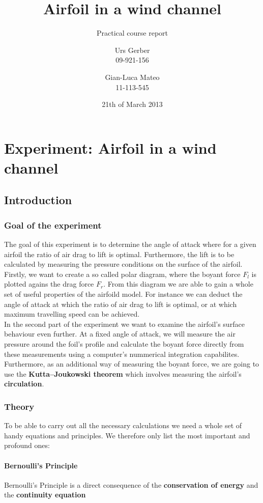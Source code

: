 \documentclass{scrreprt}
\author{Urs Gerber\\09-921-156 \and Gian-Luca Mateo\\11-113-545}
\date{21th of March 2013}
\title{Airfoil in a wind channel}
\subtitle{Practical course report}
\begin{document}
\maketitle

\tableofcontents
\newpage

\chapter{Experiment: Airfoil in a wind channel}
\section{Introduction}
\subsection{Goal of the experiment}
The goal of this experiment is to determine the angle of attack where for a given airfoil the ratio of air drag to lift is optimal. Furthermore, the lift is to be calculated by measuring the pressure conditions on the surface of the airfoil.\\

Firstly, we want to create a so called polar diagram, where the boyant force $F_l$ is plotted agains the drag force $F_r$. From this diagram we are able to gain a whole set of useful properties of the airfoild model. For instance we can deduct the angle of attack at which the ratio of air drag to lift is optimal, or at which maximum travelling speed can be achieved.\\

In the second part of the experiment we want to examine the airfoil's surface behaviour even further. At a fixed angle of attack, we will measure the air pressure around the foil's profile and calculate the boyant force directly from these measurements using a computer's nummerical integration capabilites. Furthermore, as an additional way of measuring the boyant force, we are going to use the \textbf{Kutta–Joukowski theorem} which involves measuring the airfoil's \textbf{circulation}.

\subsection{Theory}
To be able to carry out all the necessary calculations we need a whole set of handy equations and principles. We therefore only list the most important and profound ones:

\subsubsection{Bernoulli's Principle}
Bernoulli's Principle is a direct consequence of the \textbf{conservation of energy} and the \textbf{continuity equation}
\end{document}
